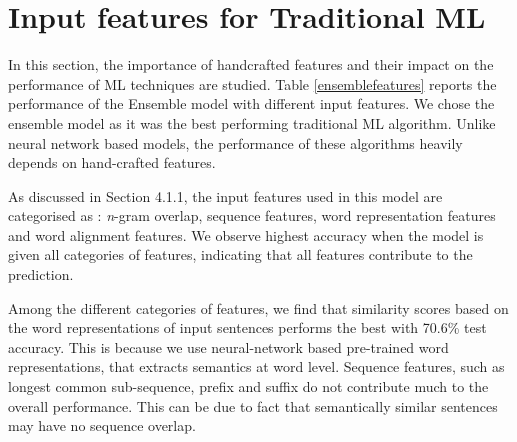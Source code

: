 \documentclass[12pt]{report} %
\begin{document}
%
%
%
%
%
%
%
%

\section{Input features for Traditional ML}
\label{fests}

In this section, the importance of handcrafted features and their impact on the performance of ML techniques are studied. Table \ref{ensemblefeatures} reports the performance of the Ensemble model with different input features. We chose the ensemble model as it was the best performing traditional ML algorithm. Unlike neural network based models, the performance of these algorithms heavily depends on hand-crafted features. 

As discussed in Section 4.1.1, the input features used in this model are categorised as : \textit{n}-gram overlap, sequence features, word representation features and word alignment features. We observe highest accuracy when the model is given all categories of features, indicating that all features contribute to the prediction.


Among the different categories of features, we find that similarity scores based on the word representations of input sentences performs the best with 70.6\% test accuracy. This is because we use neural-network based pre-trained word representations, that extracts semantics at word level. Sequence features, such as longest common sub-sequence, prefix and suffix do not contribute much to the overall performance. This can be due to fact that semantically similar sentences may have no sequence overlap.
\end{document}

